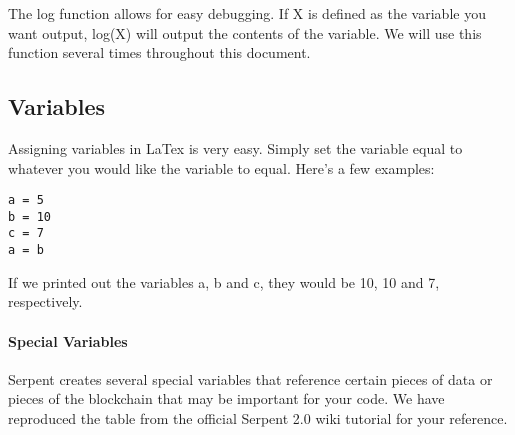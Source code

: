 \documentclass[12pt]{article}
\begin{document}
The log function allows for easy debugging. If X is defined as the variable you want output, log(X) will output the contents of the variable. We will use this function several times throughout this document.


\subsection{Variables}

Assigning variables in LaTex is very easy. Simply set the variable equal to whatever you would like the variable to equal. Here's a few examples:

\begin{lstlisting}
a = 5
b = 10
c = 7
a = b
\end{lstlisting}

If we printed out the variables a, b and c, they would be 10, 10 and 7, respectively. 

\paragraph{Special Variables}

Serpent creates several special variables that reference certain pieces of data or pieces of the blockchain that may be important for your code. We have reproduced the table from the official Serpent 2.0 wiki tutorial for your reference. \cite{Serpent}
\end{document}
